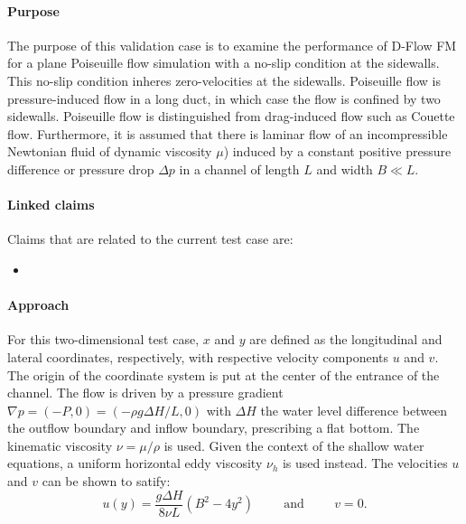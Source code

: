 

\paragraph*{Purpose}
The purpose of this validation case is to examine the performance of D-Flow FM for a plane Poiseuille flow simulation with a no-slip condition at the sidewalls. This no-slip condition inheres zero-velocities at the sidewalls. Poiseuille flow is pressure-induced flow in a long duct, in which case the flow is confined by two sidewalls. Poiseuille flow is distinguished from drag-induced flow such as Couette flow. Furthermore, it is assumed that there is laminar flow of an incompressible Newtonian fluid of dynamic viscosity $\mu$) induced by a constant positive pressure difference or pressure drop $\Delta p$ in a channel of length $L$ and width $B \ll L$. 


\paragraph*{Linked claims}
Claims that are related to the current test case are:
\begin{itemize}
\item {}
\end{itemize}


\paragraph*{Approach}
For this two-dimensional test case, $x$ and $y$ are defined as the longitudinal and lateral coordinates, respectively, with respective velocity components $u$ and $v$. The origin of the coordinate system is put at the center of the entrance of the channel. The flow is driven by a pressure gradient $\nabla p = (-P,0) = (-\rho g \Delta H / L,0)$ with $\Delta H$ the water level difference between the outflow boundary and inflow boundary, prescribing a flat bottom. The kinematic viscosity $\nu = \mu/\rho$ is used. Given the context of the shallow water equations, a uniform horizontal eddy viscosity $\nu_h$ is used instead. The velocities $u$ and $v$ can be shown to satify:
\begin{equation}
u(y) = \frac{g \Delta H}{8\nu L}\left(B^2 - 4y^2\right) \hspace{1cm} \textrm{and} \hspace{1cm} v = 0.
\end{equation}


